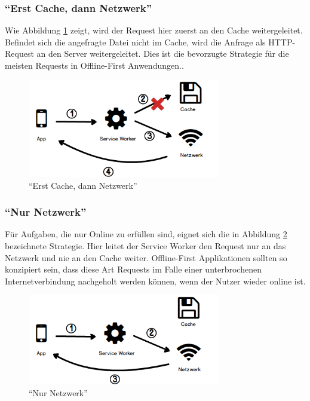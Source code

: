 \documentclass[a4paper, 12pt]{scrreprt}
\begin{document}
\subsubsection{\enquote{Erst Cache, dann Netzwerk}}
Wie Abbildung \ref{fig:cachingCacheFirst} zeigt, wird der Request hier zuerst an den Cache weitergeleitet. Befindet sich die angefragte Datei nicht im Cache, wird die Anfrage als \ac{HTTP}-Request an den Server weitergeleitet. Dies ist die bevorzugte Strategie für die meisten Requests in Offline-First Anwendungen.\autocite[Kapitel 05]{BookBuildingPWAs}.

\begin{figure}[h]
	\centering
	\includegraphics[width=0.75\textwidth]{cachefirst.png}
	\caption{\enquote{Erst Cache, dann Netzwerk}}
	\label{fig:cachingCacheFirst}
\end{figure}

\subsubsection{\enquote{Nur Netzwerk}}
Für Aufgaben, die nur Online zu erfüllen sind, eignet sich die in Abbildung \ref{fig:cachingNetworkOnly} bezeichnete Strategie. Hier leitet der Service Worker den Request nur an das Netzwerk und nie an den Cache weiter. Offline-First Applikationen sollten so konzipiert sein, dass diese Art Requests im Falle einer unterbrochenen Internetverbindung nachgeholt werden können, wenn der Nutzer wieder online ist.

\begin{figure}[h]
	\centering
	\includegraphics[width=0.75\textwidth]{networkonly.png}
	\caption{\enquote{Nur Netzwerk}}
	\label{fig:cachingNetworkOnly}
\end{figure}
\end{document}
